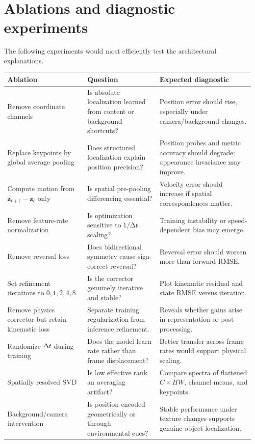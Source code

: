 \documentclass[11pt,a4paper]{article}
\begin{document}
\section{Ablations and diagnostic experiments}
The following experiments would most efficiently test the architectural explanations.
\begin{longtable}{p{}p{}p{}}\toprule
Ablation & Question & Expected diagnostic \\\midrule\endhead
Remove coordinate channels & Is absolute localization learned from content or background shortcuts? & Position error should rise, especially under camera/background changes.\\
Replace keypoints by global average pooling & Does structured localization explain position precision? & Position probes and metric accuracy should degrade; appearance invariance may improve.\\
Compute motion from $\bm z_{t+1}-\bm z_t$ only & Is spatial pre-pooling differencing essential? & Velocity error should increase if spatial correspondences matter.\\
Remove feature-rate normalization & Is optimization sensitive to $1/\Delta t$ scaling? & Training instability or speed-dependent bias may emerge.\\
Remove reversal loss & Does bidirectional symmetry cause sign-correct reversal? & Reversal error should worsen more than forward RMSE.\\
Set refinement iterations to $0,1,2,4,8$ & Is the corrector genuinely iterative and stable? & Plot kinematic residual and state RMSE versus iteration.\\
Remove physics corrector but retain kinematic loss & Separate training regularization from inference refinement. & Reveals whether gains arise in representation or post-processing.\\
Randomize $\Delta t$ during training & Does the model learn rate rather than frame displacement? & Better transfer across frame rates would support physical scaling.\\
Spatially resolved SVD & Is low effective rank an averaging artifact? & Compare spectra of flattened $C\times HW$, channel means, and keypoints.\\
Background/camera intervention & Is position encoded geometrically or through environmental cues? & Stable performance under texture changes supports genuine object localization.\\\bottomrule
\end{longtable}
\end{document}
